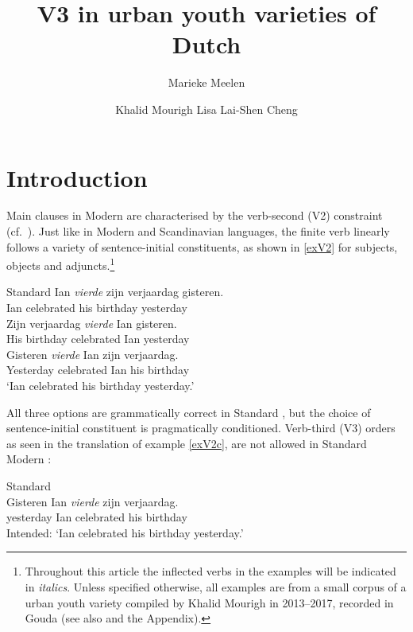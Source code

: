 \documentclass[output=paper]{langsci/langscibook}
\title{V3 in urban youth varieties of Dutch}
\author{Marieke Meelen\affiliation{University of Cambridge}\and
    Khalid Mourigh\affiliation{Leiden University}\lastand
    Lisa Lai-Shen Cheng \affiliation{Leiden University}}
\begin{document}
\glsresetall
\maketitle
\section{Introduction}\label{sec:intro}


Main clauses in Modern  are characterised by the verb-second
(V2) constraint (cf.\ \citealt{Zwart:1997}). Just like in Modern  and
Scandinavian languages, the finite verb linearly follows a variety of
sentence-initial constituents, as shown in \eqref{exV2} for subjects,
objects and adjuncts.\footnote{Throughout this article the inflected verbs in
    the examples will be indicated in \textit{italics}. Unless specified
    otherwise, all examples are from a small corpus of a  urban youth
    variety compiled by Khalid Mourigh in 2013--2017, recorded in Gouda (see
also  and the Appendix).}

\ea\label{exV2} Standard 
    \ea
    \gll Ian \textit{vierde} zijn verjaardag gisteren.\\
    Ian celebrated his birthday yesterday\\
    \ex
    \gll Zijn verjaardag \textit{vierde} Ian gisteren.\\
    His birthday celebrated Ian yesterday\\
    \ex
    \gll\label{exV2c}Gisteren \textit{vierde} Ian zijn verjaardag.\\
    Yesterday celebrated Ian his birthday\\
    \trans \enquote*{Ian celebrated his birthday yesterday.}
    \z
\z

\noindent All three options are grammatically correct in Standard , but
the choice of sentence-initial constituent is pragmatically conditioned.
Verb-third (V3) orders as seen in the  translation of example
\eqref{exV2c}, are not allowed in Standard Modern :

\begin{exe}
\ex\label{exV3} Standard \\
    \gll \llap{*}Gisteren Ian \textit{vierde} zijn verjaardag.\\
yesterday Ian celebrated his birthday\\
\trans Intended: `Ian celebrated his birthday yesterday.'
\end{exe}
\end{document}
